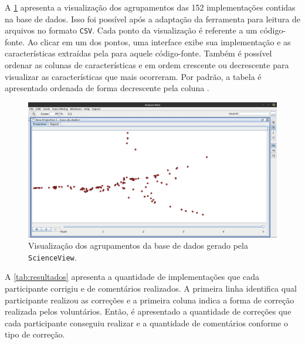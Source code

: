		A \cref{fig:projecaoFinal} apresenta a visualização dos agrupamentos das 152
		implementações contidas na base de dados. Isso foi possível após a adaptação da
		ferramenta para leitura de arquivos no formato \texttt{CSV}. Cada ponto da
		visualização é referente a um código-fonte. Ao clicar em um dos pontos,
		uma interface exibe sua implementação e as características extraídas pela
		 para aquele código-fonte. Também é possível ordenar
		as colunas de características  e  em
		ordem  crescente ou decrescente para visualizar as características que mais
		ocorreram. Por padrão, a tabela é apresentado ordenada de forma decrescente
		pela coluna .
	
		\begin{figure}[h]
			\centering
			\includegraphics[width=1\linewidth]{imagem/projecaoFinal}
			\caption[Visualização dos agrupamentos da base de dados gerado pela \texttt{ScienceView}]
			{Visualização dos agrupamentos da base de dados gerado pela \texttt{ScienceView}.}
			\label{fig:projecaoFinal}
		\end{figure}
		
		A \cref{tab:resultados} apresenta a quantidade de implementações que cada
		participante corrigiu e de comentários realizados. A primeira linha identifica
		qual participante realizou as correções e a primeira coluna indica a forma
		de correção realizada pelos voluntários. Então, é apresentado a quantidade
		de correções que cada participante conseguiu realizar e a quantidade de
		comentários conforme o tipo de correção.
		
